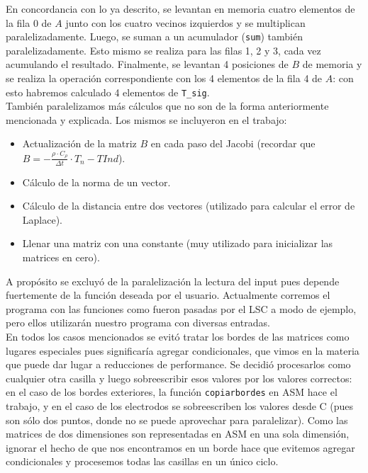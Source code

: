 \documentclass[a4paper]{article}
\begin{document}
En concordancia con lo ya descrito, se levantan en memoria cuatro elementos
de la fila 0 de $A$ junto con los cuatro vecinos izquierdos y se multiplican
paralelizadamente. Luego, se suman a un acumulador (\texttt{sum}) también
paralelizadamente. Esto mismo se realiza para las filas 1, 2 y 3, cada vez
acumulando el resultado. Finalmente, se levantan 4 posiciones de $B$ de memoria
y se realiza la operación correspondiente con los 4 elementos de la fila 4 de $A$:
con esto habremos calculado 4 elementos de \texttt{T\_sig}.\\

También paralelizamos más cálculos que no son de la forma 
anteriormente mencionada y explicada. Los mismos se incluyeron en el trabajo:

\begin{itemize}
\item Actualización de la matriz $B$ en cada paso del Jacobi (recordar que $B = -\frac{\rho \cdot C_\rho}{\Delta t} \cdot T_n - TInd$).
\item Cálculo de la norma de un vector.
\item Cálculo de la distancia entre dos vectores (utilizado para calcular el error de Laplace).
\item Llenar una matriz con una constante (muy utilizado para inicializar las matrices en cero).
\end{itemize}

A propósito se excluyó de la paralelización la lectura del input pues depende 
fuertemente de la función deseada por el usuario. Actualmente corremos el programa
con las funciones como fueron pasadas por el LSC a modo de ejemplo, 
pero ellos utilizarán nuestro programa con diversas entradas. \\

En todos los casos mencionados se evitó tratar los bordes de las 
matrices como lugares especiales pues significaría agregar 
condicionales, que vimos en la materia que puede dar lugar a 
reducciones de performance. Se decidió procesarlos como cualquier 
otra casilla y luego sobreescribir esos valores por los valores 
correctos: en el caso de los bordes exteriores, la función 
\texttt{copiarbordes} en ASM hace el trabajo, y en el caso de los 
electrodos se sobreescriben los valores desde C (pues son sólo dos 
puntos, donde no se puede aprovechar para paralelizar). Como las 
matrices de dos dimensiones son representadas en ASM en una sola 
dimensión, ignorar el hecho de que nos encontramos en un borde hace 
que evitemos agregar condicionales y procesemos todas las casillas 
en un único ciclo.\\
\end{document}
